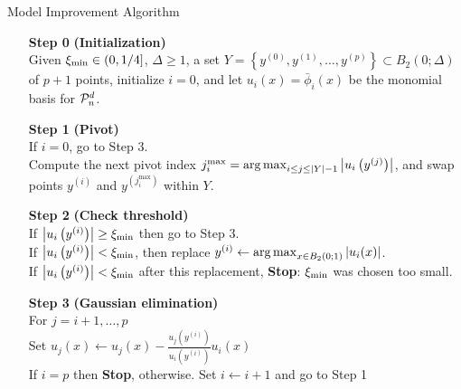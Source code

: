 \documentclass{article}
\begin{document}
{
\begin{fullwidth}[leftmargin=0in, rightmargin=0in, width=\linewidth-0.5in]
\begin{flushleft}

\begin{algorithm}[H]
    \caption{Model Improvement Algorithm \label{alg:model_improvement} }
    \label{model_improving_algorithm}
    \begin{itemize}
        \item[\textbf{Step 0}] \textbf{(Initialization)} \\
            Given $\xi_{\text{min}} \in (0,1/4]$, $\Delta \ge 1$, a set $Y = \left\{y^{(0)}, y^{(1)}, \ldots, y^{(p)}\right\} \subset B_2(0;\Delta)$ of $p+1$ points,
            initialize $i=0$, and let $u_i(x)= \bar \phi_i(x)$ be the monomial basis for $\mathcal{P}^d_n$.
		\item[\textbf{Step 1}] \textbf{(Pivot)} \\
			If $i = 0$, go to Step 3. \\
			Compute the next pivot index $j^{\textrm{max}}_i = \operatorname*{arg\,max}_{i \le j \le |Y|-1} \left|u_i\left(y^{(j)}\right)\right|$,
			and swap points $y^{(i)}$ and $y^{(j^{\textrm{max}}_i)}$ within $Y$.
			
        \item[\textbf{Step 2}] \textbf{(Check threshold)} \\
                If $\left|u_i\left(y^{(i)}\right)\right| \ge \xi_{\text{min}}$ then go to Step 3. \\
                If $\left|u_i\left(y^{(i)}\right)\right| < \xi_{\text{min}}$, then replace $y^{(i)} \gets \operatorname*{arg\,max}_{x \in B_2\left(0; 1 \right)}\left|u_i(x)\right|$. \\
				If $\left|u_i\left(y^{(i)}\right)\right| < \xi_{\text{min}}$ after this replacement,  \textbf{Stop}: $\xi_{\text{min}}$ was chosen too small.
        \item[\textbf{Step 3}] \textbf{(Gaussian elimination)} \\
        	For $j = i+1, \ldots, p$ \\
        	\hspace{2em} Set $u_j(x) \gets u_j(x) - \frac{u_j\left(y^{(i)}\right)}{u_i\left(y^{(i)}\right)} u_i(x)$ \\
            If $i = p$ then \textbf{Stop}, otherwise.  Set $i \gets i+1$ and go to Step 1
    \end{itemize}
\end{algorithm}

\end{flushleft}
\end{fullwidth}
}
\end{document}
